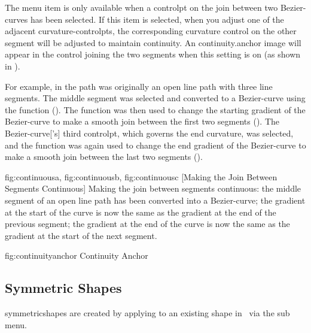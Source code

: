 The  menu item is only available
when a \gls*{controlpt} on the join between two \glspl{Bezier-curve}
has been selected. If this item is selected, when you adjust one of
the adjacent \glspl{curvature-controlpt}, the corresponding curvature
control on the other segment will be adjusted to maintain
\gls{continuity}. An \gls{continuity.anchor} image will appear in the control joining the
two segments when this setting is on (as shown in
).

For example, in  the path was originally
an open line \gls{path} with three line segments.  The middle segment was
selected and converted to a \gls{Bezier-curve} using the
 function
(). The
 function was then
used to change the starting \gls{gradient} of the \gls{Bezier-curve} to make
a smooth join between the first two segments
().  The \gls{Bezier-curve}['s] third
\gls*{controlpt}, which governs the end curvature, was selected, and
the  function was
again used to change the end \gls{gradient} of the \gls{Bezier-curve} to
make a smooth join between the last two segments
().

{
 {fig:continuousa}{}{},
 {fig:continuousb}{}{},
 {fig:continuousc}{}{}
}
[Making the Join Between Segments Continuous]
{Making the join between segments continuous: 
 the middle segment of
an open line path has been converted into a \gls{Bezier-curve};
 the gradient at the start of the curve is now the same as
the gradient at the end of the previous segment; 
 the
gradient at the end of the curve is now the same as the gradient at
the start of the next segment.}

\FloatFig
  {fig:continuityanchor}
   {}
   {Continuity Anchor}


\subsection{Symmetric Shapes}\label{sec:symmetric}

\Glspl{symmetricshape} are created by applying
 to an existing \gls{shape} in 
\editpathmode\ via the  sub menu.

